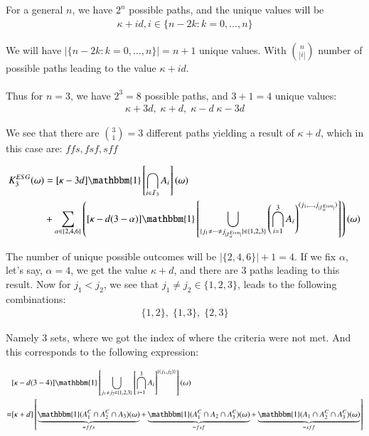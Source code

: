 For a general $n$, we have $2^{n}$ possible paths, and the unique values will be
\begin{align*}
\kappa + id, i\in \{n-2k: k=0, \dots, n\}    
\end{align*}

We will have $|\{n-2k: k=0, \dots, n\}| = n + 1$ unique values. With ${n \choose |i|}$ number of possible paths leading to the value $\kappa + id$. 
\\~\\
Thus for $n = 3$, we have $2^{3} = 8$ possible paths, and $3+1 =4$ unique values: 
\begin{align*}
\kappa +3d, \; \kappa +d,\; \kappa -d\; \kappa - 3d    
\end{align*} 

We see that there are ${3 \choose 1} = 3$ different paths yielding a result of $\kappa +d$, which in this case are: $ffs, fsf, sff$

\begin{align*}
K_{3}^{ESG}(\omega) &= 
[\kappa -3d]\mathbbm{1}\left[
\bigcap_{i\in \mathcal{I}_{3}}A_{i}
\right](\omega) \\ 
&+ 
\sum_{\alpha \in \{2,4,6\}}
\left(
[\kappa -d(3-\alpha)]\mathbbm{1}\left[
\bigcup_{\{
j_{1}\neq \dots \neq j_{|\mathcal{I}_{\alpha}^{Even}|}
\}
\in \{1,2,3\}
}\left(
\bigcap_{i =1}^{3}A_{i}
\right)^{
(j_{1}, \dots , j_{|\mathcal{I}_{\alpha}^{Even}|})
}
\right]
\right)(\omega) 
\end{align*}

The number of unique possible outcomes will be $|\{2,4,6\}| + 1 = 4$. If we fix $\alpha$, let's say, $\alpha = 4$, we get the value $\kappa +d$, and there are $3$ paths leading to this result. Now for $j_{1} < j_{2}$, we see that $j_{1} \neq j_{2} \in \{1,2,3\}$, leads to the following combinations: 
\begin{align*}
\{1,2\}, \; \{1,3\},\; \{2,3\}    
\end{align*}

Namely $3$ sets, where we got the index of where the criteria were not met. And this corresponds to the following expression: 

\begin{align*}
 &[\kappa - d(3-4)]\mathbbm{1}\left[
\bigcup_{j_{1}\neq j_{2}\in \{1,2,3\}}
\left[\bigcap_{i=1}^{3}A_{i}\right]^{\{(j_{1}, j_{2})\}}
\right](\omega) \\
= &[\kappa + d]\left[
\underbrace{
\mathbbm{1}(A_{1}^{C}\cap A_{2}^{C}\cap A_{3})(\omega)
}_{=ffs}
+ 
\underbrace{
\mathbbm{1}(A_{1}^{C}\cap A_{2}\cap A_{3}^{C})(\omega)
}_{=fsf} + 
\underbrace{
\mathbbm{1}(A_{1}\cap A_{2}^{C}\cap A_{3}^{C})(\omega)
}_{= sff}
\right]   
\end{align*}


